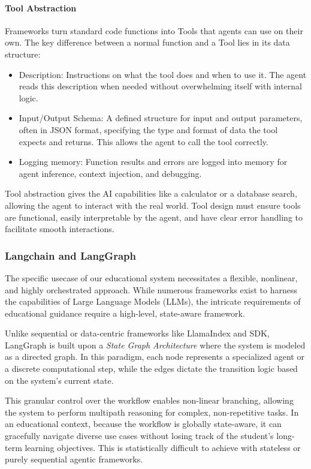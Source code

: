 \paragraph*{{Tool Abstraction}}
Frameworks turn standard code functions into Tools that agents can use on their own. The key difference between a normal function and a Tool lies in its data structure: 
\begin{itemize}
    \item {Description:} Instructions on what the tool does and when to use it. The agent reads this description when needed without overwhelming itself with internal logic.
    \item {Input/Output Schema:} A defined structure for input and output parameters, often in JSON format, specifying the type and format of data the tool expects and returns. This allows the agent to call the tool correctly.
    \item {Logging memory:} Function results and errors are logged into memory for agent inference, context injection, and debugging.
\end{itemize}

Tool abstraction gives the AI capabilities like a calculator or a database search, allowing the agent to interact with the real world. Tool design must ensure tools are functional, easily interpretable by the agent, and have clear error handling to facilitate smooth interactions.

\subsubsection*{Langchain and LangGraph}\label{subsub:lang_intro}
The specific usecase of our educational system necessitates a flexible, nonlinear, and highly orchestrated approach. While numerous frameworks exist to harness the capabilities of Large Language Models (LLMs), the intricate requirements of educational guidance require a high-level, state-aware framework.

Unlike sequential or data-centric frameworks like LlamaIndex and SDK, LangGraph is built upon a \textit{State Graph Architecture} where the system is modeled as a directed graph. In this paradigm, each node represents a specialized agent or a discrete computational step, while the edges dictate the transition logic based on the system's current state. 

This granular control over the workflow enables non-linear branching, allowing the system to perform multipath reasoning for complex, non-repetitive tasks. In an educational context, because the workflow is globally state-aware, it can gracefully navigate diverse use cases without losing track of the student's long-term learning objectives. This is statistically difficult to achieve with stateless or purely sequential agentic frameworks.

